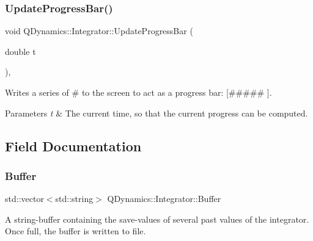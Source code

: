 \subsubsection{\texorpdfstring{Update\+Progress\+Bar()}{UpdateProgressBar()}}
{\footnotesize\ttfamily void Q\+Dynamics\+::\+Integrator\+::\+Update\+Progress\+Bar (\begin{DoxyParamCaption}\item[{double}]{t }\end{DoxyParamCaption})\hspace{0.3cm}{\ttfamily [inline]}, {\ttfamily [private]}}



Writes a series of \# to the screen to act as a progress bar\+: \mbox{[}\#\#\#\#\# \mbox{]}. 


\begin{DoxyParams}{Parameters}
{\em t} & The current time, so that the current progress can be computed. \\
\hline
\end{DoxyParams}


\subsection{Field Documentation}
\mbox{\label{classQDynamics_1_1Integrator_af8889c2bbe10237a8dd8c46b25b15d29}} 
\subsubsection{\texorpdfstring{Buffer}{Buffer}}
{\footnotesize\ttfamily std\+::vector$<$std\+::string$>$ Q\+Dynamics\+::\+Integrator\+::\+Buffer\hspace{0.3cm}{\ttfamily [private]}}



A string-\/buffer containing the save-\/values of several past values of the integrator. Once full, the buffer is written to file. 

\mbox{\label{classQDynamics_1_1Integrator_ae62176188110c0dcea7c65ba429d1abe}} 
